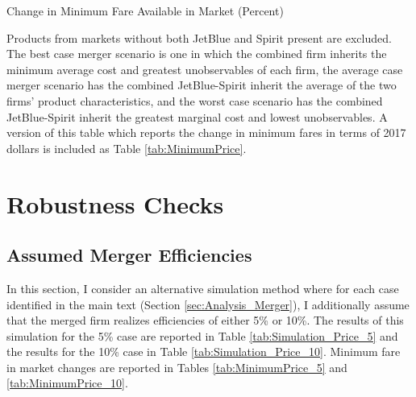 \documentclass{article}
\begin{document}
\begin{appendices}
    \begin{table}
        \caption{Change in Minimum Fare Available in Market (Percent)}
       \label{tab:MinimumPrice_Percent}
       \vspace{-15mm}
       \begin{center}
           
       \end{center}
       \vspace{-5mm}
       \footnotesize{Products from markets without both JetBlue and Spirit present are excluded. The best case merger scenario is one in which the combined firm inherits the minimum average cost and greatest unobservables of each firm, the average case merger scenario has the combined JetBlue-Spirit inherit the average of the two firms' product characteristics, and the worst case scenario has the combined JetBlue-Spirit inherit the greatest marginal cost and lowest unobservables. A version of this table which reports the change in minimum fares in terms of 2017 dollars is included as Table \ref{tab:MinimumPrice}.}
    \end{table}
    \pagebreak 

    \FloatBarrier
    \section{Robustness Checks}
    \setcounter{table}{0}
    \setcounter{figure}{0}
    \subsection{Assumed Merger Efficiencies}
    \label{App:Efficiencies}
    In this section, I consider an alternative simulation method where for each case identified in the main text (Section \ref{sec:Analysis_Merger}), I additionally assume that the merged firm realizes efficiencies of either 5\% or 10\%. The results of this simulation for the 5\% case are reported in Table \ref{tab:Simulation_Price_5} and the results for the 10\% case in Table \ref{tab:Simulation_Price_10}. Minimum fare in market changes are reported in Tables \ref{tab:MinimumPrice_5} and \ref{tab:MinimumPrice_10}. 


\end{appendices}
\end{document}
